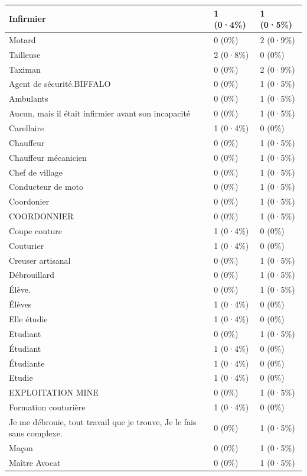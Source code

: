 \documentclass[
]{book}
\begin{document}
\begin{tabular}{l|l|l}
\hline
Infirmier & 1 (0·4\%) & 1 (0·5\%)\\
\hline
Motard & 0 (0\%) & 2 (0·9\%)\\
\hline
Tailleuse & 2 (0·8\%) & 0 (0\%)\\
\hline
Taximan & 0 (0\%) & 2 (0·9\%)\\
\hline
Agent de sécurité.BIFFALO & 0 (0\%) & 1 (0·5\%)\\
\hline
Ambulants & 0 (0\%) & 1 (0·5\%)\\
\hline
Aucun, mais il était infirmier avant son incapacité & 0 (0\%) & 1 (0·5\%)\\
\hline
Carellaire & 1 (0·4\%) & 0 (0\%)\\
\hline
Chauffeur & 0 (0\%) & 1 (0·5\%)\\
\hline
Chauffeur mécanicien & 0 (0\%) & 1 (0·5\%)\\
\hline
Chef de village & 0 (0\%) & 1 (0·5\%)\\
\hline
Conducteur de moto & 0 (0\%) & 1 (0·5\%)\\
\hline
Coordonier & 0 (0\%) & 1 (0·5\%)\\
\hline
COORDONNIER & 0 (0\%) & 1 (0·5\%)\\
\hline
Coupe couture & 1 (0·4\%) & 0 (0\%)\\
\hline
Couturier & 1 (0·4\%) & 0 (0\%)\\
\hline
Creuser artisanal & 0 (0\%) & 1 (0·5\%)\\
\hline
Débrouillard & 0 (0\%) & 1 (0·5\%)\\
\hline
Élève. & 0 (0\%) & 1 (0·5\%)\\
\hline
Élèves & 1 (0·4\%) & 0 (0\%)\\
\hline
Elle étudie & 1 (0·4\%) & 0 (0\%)\\
\hline
Etudiant & 0 (0\%) & 1 (0·5\%)\\
\hline
Étudiant & 1 (0·4\%) & 0 (0\%)\\
\hline
Étudiante & 1 (0·4\%) & 0 (0\%)\\
\hline
Etudie & 1 (0·4\%) & 0 (0\%)\\
\hline
EXPLOITATION MINE & 0 (0\%) & 1 (0·5\%)\\
\hline
Formation couturière & 1 (0·4\%) & 0 (0\%)\\
\hline
Je me débrouie, tout travail que je trouve,
Je le fais sans complexe. & 0 (0\%) & 1 (0·5\%)\\
\hline
Maçon & 0 (0\%) & 1 (0·5\%)\\
\hline
Maître Avocat & 0 (0\%) & 1 (0·5\%)\\

\end{tabular}
\end{document}
